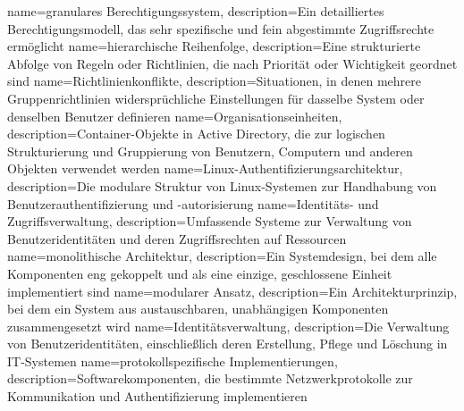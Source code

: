 {
	name={gra\-nu\-la\-res Be\-rech\-ti\-gungs\-sys\-tem},
	description={Ein de\-tail\-lier\-tes Be\-rech\-ti\-gungs\-mo\-dell, das sehr spe\-zi\-fi\-sche und fein ab\-ge\-stimm\-te Zu\-griffs\-rech\-te er\-mög\-licht}
}
{
	name={hier\-ar\-chi\-sche Rei\-hen\-fol\-ge},
	description={Eine struk\-tu\-rier\-te Ab\-fol\-ge von Re\-geln oder Richt\-li\-ni\-en, die nach Prio\-ri\-tät oder Wich\-tig\-keit ge\-ord\-net sind}
}
{
	name={Richt\-li\-ni\-en\-kon\-flik\-te},
	description={Si\-tua\-tio\-nen, in de\-nen meh\-re\-re Grup\-pen\-richt\-li\-ni\-en wi\-der\-sprüch\-li\-che Ein\-stel\-lun\-gen für das\-sel\-be Sys\-tem oder den\-sel\-ben Be\-nut\-zer de\-fi\-nie\-ren}
}
{
	name={Or\-ga\-ni\-sa\-ti\-ons\-ein\-hei\-ten},
	description={Con\-tai\-ner-Ob\-jek\-te in Ac\-tive Di\-rec\-to\-ry, die zur lo\-gi\-schen Struk\-tu\-rie\-rung und Grup\-pie\-rung von Be\-nut\-zern, Com\-pu\-tern und an\-de\-ren Ob\-jek\-ten ver\-wen\-det wer\-den}
}
{
	name={Li\-nux-Au\-then\-ti\-fi\-zie\-rungs\-ar\-chi\-tek\-tur},
	description={Die mo\-du\-la\-re Struk\-tur von Li\-nux-Sys\-te\-men zur Hand\-ha\-bung von Be\-nut\-zer\-au\-then\-ti\-fi\-zie\-rung und -au\-to\-ri\-sie\-rung}
}
{
	name={Iden\-ti\-täts- und Zu\-griffs\-ver\-wal\-tung},
	description={Um\-fas\-sen\-de Sys\-te\-me zur Ver\-wal\-tung von Be\-nut\-zer\-iden\-ti\-tä\-ten und de\-ren Zu\-griffs\-rech\-ten auf Res\-sour\-cen}
}
{
	name={mo\-no\-li\-thi\-sche Ar\-chi\-tek\-tur},
	description={Ein Sys\-tem\-de\-sign, bei dem alle Kom\-po\-nen\-ten eng ge\-kop\-pelt und als eine ein\-zi\-ge, ge\-schlos\-se\-ne Ein\-heit im\-ple\-men\-tiert sind}
}
{
	name={mo\-du\-la\-rer An\-satz},
	description={Ein Ar\-chi\-tek\-tur\-prin\-zip, bei dem ein Sys\-tem aus aus\-tausch\-ba\-ren, un\-ab\-hän\-gi\-gen Kom\-po\-nen\-ten zu\-sam\-men\-ge\-setzt wird}
}
{
	name={Iden\-ti\-täts\-ver\-wal\-tung},
	description={Die Ver\-wal\-tung von Be\-nut\-zer\-iden\-ti\-tä\-ten, ein\-schließ\-lich de\-ren Er\-stel\-lung, Pfle\-ge und Lö\-schung in IT-Sys\-te\-men}
}
{
	name={pro\-to\-koll\-spe\-zi\-fi\-sche Im\-ple\-men\-tie\-run\-gen},
	description={Soft\-ware\-kom\-po\-nen\-ten, die be\-stimm\-te Netz\-werk\-pro\-to\-kol\-le zur Kom\-mu\-ni\-ka\-ti\-on und Au\-then\-ti\-fi\-zie\-rung im\-ple\-men\-tie\-ren}
}
